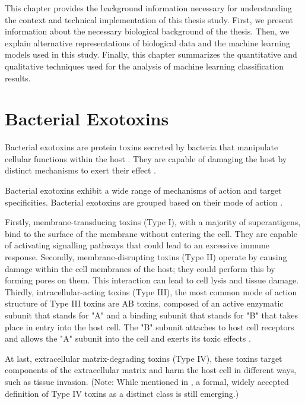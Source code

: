 This chapter provides the background information necessary for understanding the context and technical implementation of this thesis study.
First, we present information about the necessary biological background of the thesis.
Then, we explain alternative representations of biological data and the machine learning models used in this study.
Finally, this chapter summarizes the quantitative and qualitative techniques used for the analysis of machine learning classification results.

\section{Bacterial Exotoxins}

Bacterial exotoxins are protein toxins secreted by bacteria that manipulate cellular functions within the host \cite{sheehan2022bacterial}.
They are capable of damaging the host by distinct mechanisms to exert their effect \cite{popoff2018bacterial} \cite{Ghazaei2022}.

Bacterial exotoxins exhibit a wide range of mechanisms of action and target specificities. Bacterial exotoxins are grouped based on their mode of action  \cite{Ghazaei2022} \cite{kruger2024toxin}.

Firstly, membrane-transducing toxins (Type I), with a majority of superantigens, bind to the surface of the membrane without entering the cell. They are capable of activating signalling pathways that could lead to an excessive immune response. Secondly, membrane-disrupting toxins (Type II) operate by causing damage within the cell membranes of the host; they could perform this by forming pores on them. This interaction can lead to cell lysis and tissue damage. Thirdly, intracellular-acting toxins (Type III), the most common mode of action structure of Type III toxins are AB toxins, composed of an active enzymatic subunit that stands for "A" and a binding subunit that stands for "B" that takes place in entry into the host cell. The "B" subunit attaches to host cell receptors and allows the "A" subunit into the cell and exerts its toxic effects  \cite{Ghazaei2022}  \cite{henkel_toxins_2009} \cite{Idris2024}.

At last, extracellular matrix-degrading toxins (Type IV), these toxins target components of the extracellular matrix and harm the host cell in different ways, such as tissue invasion. (Note: While mentioned in \cite{kruger2024toxin}, a formal, widely accepted definition of Type IV toxins as a distinct class is still emerging.)

